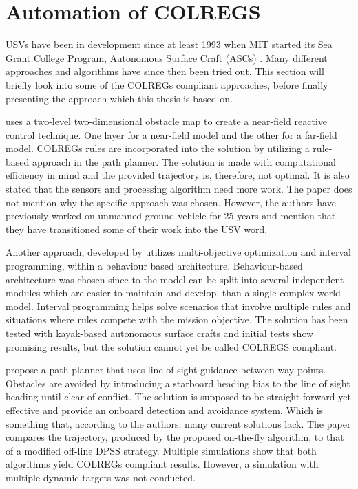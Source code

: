 \chapter{Automation of COLREGS}
\label{chap:aut_colregs}
USVs have been in development since at least 1993 when MIT started its Sea Grant College Program, Autonomous Surface Craft (ASCs) \cite{manley2008unmanned}. Many different approaches and algorithms have since then been tried out. This section will briefly look into some of the COLREGs compliant approaches, before finally presenting the approach which this thesis is based on.

\textcite{larson2007advances} uses a two-level two-dimensional obstacle map to create a near-field reactive control technique. One layer for a near-field model and the other for a far-field model. COLREGs rules are incorporated into the solution by utilizing a rule-based approach in the path planner. The solution is made with computational efficiency in mind and the provided trajectory is, therefore, not optimal. It is also stated that the sensors and processing algorithm need more work. The paper does not mention why the specific approach was chosen. However, the authors have previously worked on unmanned ground vehicle for 25 years and mention that they have transitioned some of their work into the USV word.


Another approach, developed by \textcite{benjamin2004colregs,benjamin2006method} utilizes multi-objective optimization and interval programming, within a behaviour based architecture. Behaviour-based architecture was chosen since  to the model can be split into several independent modules which are easier to maintain and develop, than a single complex world model.  Interval programming helps solve scenarios that involve  multiple rules and situations where rules compete with the mission objective. The solution has been tested with kayak-based autonomous surface crafts and initial tests show promising results, but the solution cannot yet be called COLREGS compliant.


\textcite{naeem2012colregs}
propose a path-planner that uses line of sight guidance between way-points. Obstacles are avoided by introducing a starboard heading bias to the line of sight heading until clear of conflict. The solution is supposed to be straight forward yet effective and  provide an onboard detection and avoidance system. Which is something that, according to the authors, many current solutions lack. The paper compares the trajectory, produced by the proposed on-the-fly algorithm, to that of a modified off-line DPSS strategy. Multiple simulations show that both algorithms yield COLREGs compliant results. However, a simulation with multiple dynamic targets was not conducted.

